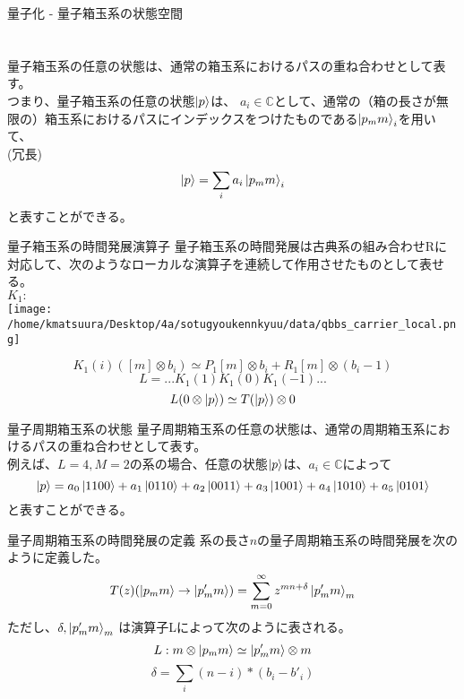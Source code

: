 \documentclass[aspectratio=169, dvipdfmx, 11pt]{beamer} %
\begin{document}
\begin{frame}{量子化}
- 量子箱玉系の状態空間\\
\leavevmode\\~\\
量子箱玉系の任意の状態は、通常の箱玉系におけるパスの重ね合わせとして表す。\\
つまり、量子箱玉系の任意の状態$\ket{p}$は、 $a_i \in \mathbb{C} $として、通常の（箱の長さが無限の）箱玉系におけるパスにインデックスをつけたものである$\ket{p_mm}_i$を用いて、\\(冗長)
$$ \ket{p} = \sum_i{a_i\ket{p_mm}_i}$$
と表すことができる。\\

\end{frame}

\begin{frame}{量子箱玉系の時間発展演算子}
量子箱玉系の時間発展は古典系の組み合わせRに対応して、次のようなローカルな演算子を連続して作用させたものとして表せる。\\
$K_1 : $\\
\texttt{[image: /home/kmatsuura/Desktop/4a/sotugyoukennkyuu/data/qbbs\_carrier\_local.png]}

$$K_1(i)([m] \otimes b_i)\simeq P_1[m] \otimes b_i + R_1[m] \otimes (b_i-1)$$
$$ L = ...K_1(1)K_1(0)K_1(-1)...$$
$$L(0 \otimes \ket{p}) \simeq T(\ket{p}) \otimes 0$$
 
\end{frame}

\begin{frame}{量子周期箱玉系の状態}
量子周期箱玉系の任意の状態は、通常の周期箱玉系におけるパスの重ね合わせとして表す。\\
例えば、$L=4,M=2$の系の場合、任意の状態$\ket{p}$は、$a_i \in \mathbb{C}$によって\\
$$\ket{p} = a_0\ket{1100} + a_1\ket{0110} + a_2\ket{0011} + a_3\ket{1001} + a_4\ket{1010} + a_5\ket{0101} $$
と表すことができる。
\end{frame}

\begin{frame}{量子周期箱玉系の時間発展の定義}
系の長さ$n$の量子周期箱玉系の時間発展を次のように定義した。
$$T(z)(\ket{p_mm} \rightarrow \ket{p'_mm}) = \sum_{m=0} ^ {\infty} z^{mn+\delta} \ket{p'_mm}_m$$
ただし、$\delta,\ket{p'_mm}_m$ は演算子Lによって次のように表される。\\
$$L: m \otimes \ket{p_mm} \simeq \ket{p'_mm} \otimes m$$
$$\delta = \sum_i (n-i)*(b_i - b'_i)$$
\end{frame}
\end{document}
